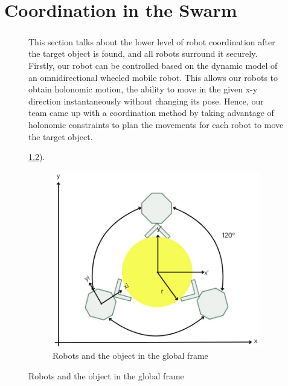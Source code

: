 \chapter{Coordination in the Swarm}

\begin{figure} [H]

\paragraph*{}
This section talks about the lower level of robot coordination after the target object is found, and all robots surround it securely. Firstly, our robot can be controlled based on the dynamic model of an omnidirectional wheeled mobile robot. This allows our robots to obtain holonomic motion, the ability to move in the given x-y direction instantaneously without changing its pose. Hence, our team came up with a coordination method by taking advantage of holonomic constraints to plan the movements for each robot to move the target object.

\ref{fig:coordination-diagram}).

\begin{figure} [H]
    \centering
    \includegraphics[width=0.5\linewidth]{assets/images/coordination/robots_with_object.jpg}
    \caption{Robots and the object in the global frame}
    \label{fig:coordination-diagram}
\end{figure}


\end{figure}
